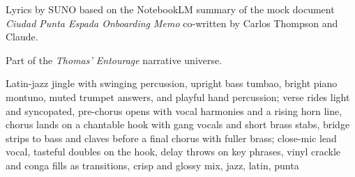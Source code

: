 
\begin{notes}
Lyrics by SUNO based on the NotebookLM summary of the mock document \emph{Ciudad Punta Espada Onboarding Memo} co-written by Carlos Thompson and Claude.

Part of the \emph{Thomas’ Entourage} narrative universe.
\end{notes}
\begin{style}
Latin-jazz jingle with swinging percussion, upright bass tumbao, bright piano montuno, muted trumpet answers, and playful hand percussion; verse rides light and syncopated, pre-chorus opens with vocal harmonies and a rising horn line, chorus lands on a chantable hook with gang vocals and short brass stabs, bridge strips to bass and claves before a final chorus with fuller brass; close-mic lead vocal, tasteful doubles on the hook, delay throws on key phrases, vinyl crackle and conga fills as transitions, crisp and glossy mix, jazz, latin, punta
\end{style}
